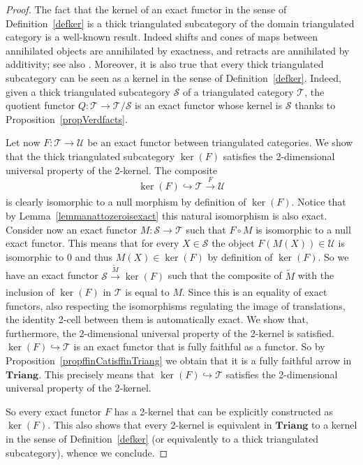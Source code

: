 \documentclass[11pt,reqno,a4paper]{amsart}
\theoremstyle{definition}
\theoremstyle{remark}
\def\nameit#1{\textrm{#1}~}
\def\prox{\nameit{Proposition}}
\def\lemx{\nameit{Lemma}}
\def\defx{\nameit{Definition}}
\newcommand{\T}{\mathcal{T}}
\renewcommand{\S}{\mathcal{S}}
\newcommand{\U}{\mathcal{U}}
\newcommand{\0}{\mathbf{0}}
\renewcommand{\1}{\mathbf{1}}
\newcommand{\Triang}{\mathbf{Triang}}
\def\:{\colon}
\def\c{\circ}
\newcommand{\aar}[2][]{\xrightarrow[#1]{#2}}
\begin{document}
\begin{proof}
The fact that the kernel of an exact functor in the sense of \defx \ref{defker} is a thick triangulated subcategory of the domain triangulated category is a well-known result. Indeed shifts and cones of maps between annihilated objects are annihilated by exactness, and retracts are annihilated by additivity; see also \cite{StacksTriKernel}. Moreover, it is also true that every thick triangulated subcategory can be seen as a kernel in the sense of \defx \ref{defker}. Indeed, given a thick triangulated subcategory $\S$ of a triangulated category $\T$, the quotient functor $Q\: \T \to \T /\S$ is an exact functor whose kernel is $\S$ thanks to \prox \ref{propVerdfacts}.

Let now $F\: \T \to \U$ be an exact functor between triangulated categories. We show that the thick triangulated subcategory $\ker(F)$ satisfies the 2-dimensional universal property of the 2-kernel. The composite
$$\ker(F) \hookrightarrow \T \aar{F} \U$$
is clearly isomorphic to a null morphism by definition of $\ker(F)$. Notice that by \lemx\ref{lemmanattozeroisexact} this natural isomorphism is also exact. Consider now an exact functor $M\: \S \to \T$ such that $F \c M$ is isomorphic to a null exact functor. This means that for every $X\in \S$ the object $F(M(X))\in \U$ is isomorphic to $0$ and thus $M(X)\in\ker(F)$ by definition of $\ker(F)$. So we have an exact functor $\S \aar{\widetilde{M}} \ker(F)$ such that the composite of $\widetilde{M}$ with the inclusion of $\ker(F)$ in $\T$ is equal to $M$. Since this is an equality of exact functors, also respecting the isomorphisms regulating the image of translations, the identity 2-cell between them is automatically exact. We show that, furthermore, the  2-dimensional universal property of the 2-kernel is satisfied. $\ker(F)\hookrightarrow \T$ is an exact functor that is fully faithful as a functor. So by \prox\ref{propffinCatisffinTriang} we obtain that it is a fully faithful arrow in $\Triang$. This precisely means that $\ker(F)\hookrightarrow \T$ satisfies the 2-dimensional universal property of the 2-kernel.

So every exact functor $F$ has a 2-kernel that can be explicitly constructed as $\ker(F)$. This also shows that every 2-kernel is equivalent in $\Triang$ to a kernel in the sense of \defx\ref{defker} (or equivalently to a thick triangulated subcategory), whence we conclude.
\end{proof}
\end{document}
